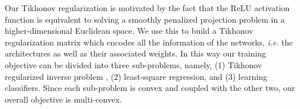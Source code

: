 \documentclass{article}
\def\eg{\emph{e.g. }}
\def\ie{\emph{i.e. }}
\begin{document}
	Our Tikhonov regularization is motivated by the fact that the ReLU activation function is equivalent to solving a smoothly penalized projection problem in a higher-dimensional Euclidean space.  We use this to build a  Tikhonov regularization matrix which encodes all the information of the networks, %
\ie the architectures as well as their associated weights. In this way our training objective can be divided into three sub-problems, namely, (1) Tikhonov regularized inverse problem \cite{willoughby1979solutions}, (2) least-square regression, and (3) learning classifiers. Since each sub-problem is convex and coupled with the other two, our overall objective is multi-convex. %
	
\end{document}
